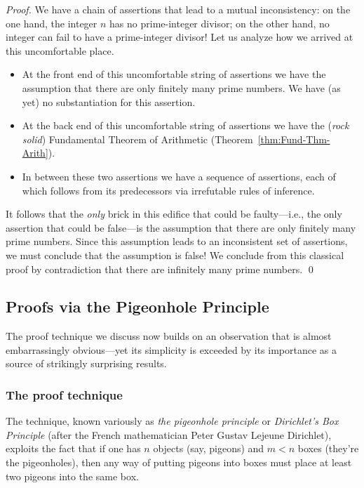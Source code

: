 \begin{proof}
We have a chain of assertions that lead to a mutual inconsistency: on
the one hand, the integer $n$ has no prime-integer divisor; on the
other hand, no integer can fail to have a prime-integer divisor!  Let
us analyze how we arrived at this uncomfortable place.
\begin{itemize}
\item
At the front end of this uncomfortable string of assertions we have
the assumption that there are only finitely many prime numbers.  We
have (as yet) no substantiation for this assertion.
\item
At the back end of this uncomfortable string of assertions we have
the ({\em rock solid}) Fundamental Theorem of Arithmetic
(Theorem~\ref{thm:Fund-Thm-Arith}).
\item
In between these two assertions we have a sequence of assertions, each
of which follows from its predecessors via irrefutable rules of
inference.
\end{itemize}
It follows that the {\em only} brick in this edifice that could be
faulty---i.e., the only assertion that could be false---is the
assumption that there are only finitely many prime numbers.  Since
this assumption leads to an inconsistent set of assertions, we must
conclude that the assumption is false!  We conclude from this
classical proof by contradiction that there are infinitely many prime
numbers.  \qed
\end{proof}


\subsection{Proofs via the Pigeonhole Principle}
\label{sec:pigeonhole}

The proof technique we discuss now builds on an observation that is
almost embarrassingly obvious---yet its simplicity is exceeded by its
importance as a source of strikingly surprising results.

\subsubsection{The proof technique}

The technique, known variously as {\it the pigeonhole principle}
or {\it Dirichlet's Box Principle}
(after the French mathematician Peter Gustav Lejeune Dirichlet),
exploits the fact that if one has $n$ objects (say, pigeons) and $m <
n$ boxes (they're the pigeonholes), then any way of putting pigeons
into boxes must place at least two pigeons into the same box.


